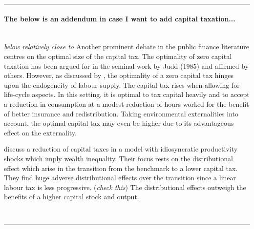 \noindent\rule[1ex]{\textwidth}{1pt}


\paragraph{The below is an addendum in case I want to add capital taxation...} \ 
\\

\noindent
\textit{below relatively close to \cite{Conesa2009TaxingAll}} 
Another prominent debate in the public finance literature centres on the optimal size of the capital tax. The optimality of zero capital taxation has been argued for in the seminal work by Judd (1985) and affirmed by others.  However, as discussed by \cite{Conesa2009TaxingAll}, the optimality of a zero capital tax hinges upon the endogeneity of labour supply. The capital tax rises when allowing for life-cycle aspects. In this setting, it is optimal to tax capital heavily and to accept a reduction in consumption at a modest reduction of hours worked for the benefit of better insurance and redistribution. Taking environmental externalities into account, the optimal capital tax may even be higher due to its advantageous effect on the externality.

\cite{Domeij2004OnTaxes} discuss a reduction of capital taxes in a model with idiosyncratic productivity shocks which imply  wealth inequality. Their focus rests on the distributional effect which arise in the transition from the benchmark to a lower capital tax. They find huge adverse distributional effects over the transition since a linear labour tax is less progressive.  (\textit{check this}) The distributional effects outweigh the benefits of a higher capital stock and output. 

\\

\noindent\rule[1ex]{\textwidth}{1pt}

